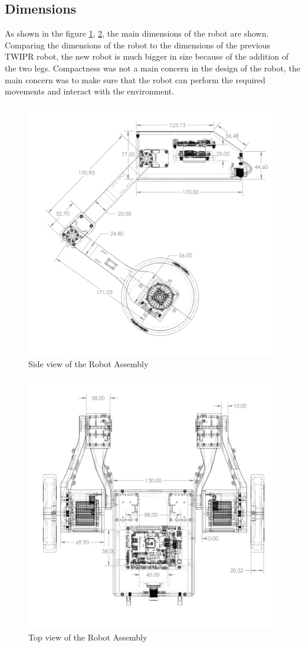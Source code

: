 \subsection{Dimensions}
As shown in the figure \ref{fig:robotassemblyv2side}, \ref{fig:robotassemblyv2top}, the main dimensions of the robot are shown.
Comparing the dimensions of the robot to the dimensions of the previous TWIPR robot, the new robot is much bigger in size because of the addition of the two legs.
Compactness was not a main concern in the design of the robot, the main concern was to make sure that the robot can perform the required movements and interact with the environment.
\begin{figure}[h]
	\centering
	\includegraphics[width=0.5\linewidth]{Robot_Assembly_V2_Side}
	\caption[Side view of the Robot Assembly]{Side view of the Robot Assembly}
	\label{fig:robotassemblyv2side}
\end{figure}
\begin{figure}[h]
	\centering
	\includegraphics[width=0.5\linewidth]{Robot_Assembly_V2_Top}
	\caption[Top view of the Robot Assembly]{Top view of the Robot Assembly}
	\label{fig:robotassemblyv2top}
\end{figure}
\newpage
